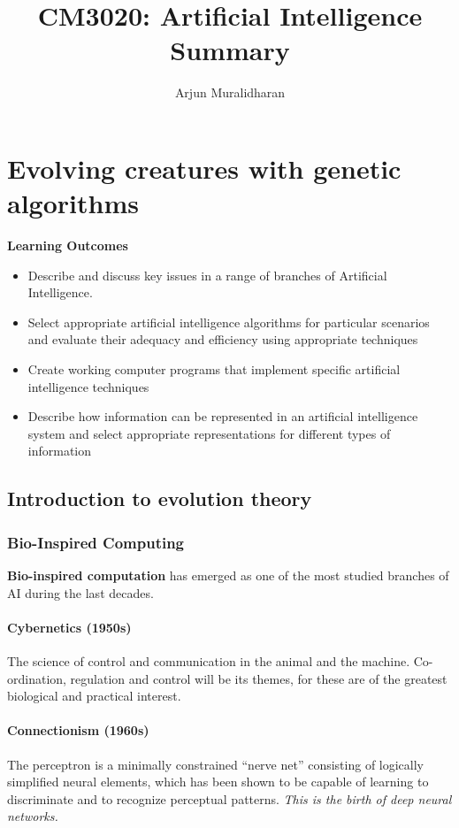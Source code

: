 \title{CM3020: Artificial Intelligence \\ Summary}
\author{Arjun Muralidharan}



\section{Evolving creatures with genetic algorithms}
\begin{mdframed}
\textbf{Learning Outcomes}
\begin{itemize}[label={\checkmark}]
    \item Describe and discuss key issues in a range of branches of Artificial Intelligence.
    \item Select appropriate artificial intelligence algorithms for particular scenarios and evaluate their adequacy and efficiency using appropriate techniques
    \item Create working computer programs that implement specific artificial intelligence techniques
    \item Describe how information can be represented in an artificial intelligence system and select appropriate representations for different types of information
\end{itemize}
\end{mdframed}

\subsection{Introduction to evolution theory}

\subsubsection{Bio-Inspired Computing}

\textbf{Bio-inspired computation} has emerged as one of the most studied branches of AI during the last decades.

\paragraph{Cybernetics (1950s)} The science of control and communication in the animal and the machine. Co-ordination, regulation and control will be its themes, for these are of the greatest biological and practical interest.

\paragraph{Connectionism (1960s)} The perceptron is a minimally constrained ``nerve net'' consisting of logically simplified neural elements, which has been shown to be capable of learning to discriminate and to recognize perceptual patterns. \textit{This is the birth of deep neural networks.}

